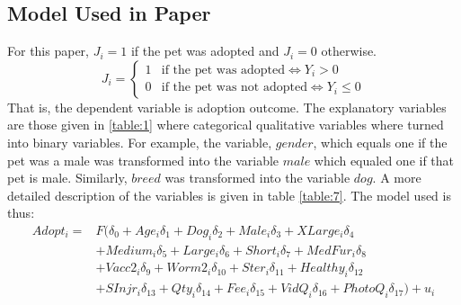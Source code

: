 \documentclass[12pt]{article}
\newcommand{\LRA}{\Leftrightarrow}
\begin{document}
		\subsection{Model Used in Paper}
		For this paper, $ J_i=1 $ if the pet was adopted and $ J_i=0 $ otherwise.
		\begin{equation}
			J_i=\begin{cases}
			1& \text{if the pet was adopted} \LRA Y_i>0 \\
			0& \text{if the pet was not adopted} \LRA Y_i \leq 0
			\end{cases}
		\end{equation}
		That is, the dependent variable is adoption outcome. The explanatory variables are those given in \ref{table:1} where categorical qualitative variables where turned into binary variables. For example, the variable, $ gender $, which equals one if the pet was a male was transformed into the variable $ male $ which equaled one if that pet is male. Similarly, $ breed $ was transformed into the variable $ dog $. A more detailed description of the variables is given in table \ref{table:7}. The model used is thus:
		\begin{align}
			Adopt_i=&F(\delta_0 + Age_i\delta_1+     Dog_i\delta_2+     Male_i\delta_3+     XLarge_i\delta_4 \nonumber \\
			&+Medium_i\delta_5+   Large_i\delta_6+    Short_i\delta_7+ MedFur_i\delta_8 \nonumber\\
			&+Vacc2_i\delta_9+    Worm2_i\delta_{10}  +Ster_i\delta_{11}+     Healthy_i\delta_{12} \nonumber \\  
			&+SInjr_i\delta_{13} +Qty_i\delta_{14}+      Fee_i\delta_{15}+      VidQ_i\delta_{16}+  PhotoQ_i\delta_{17}  ) + u_i 
		\end{align}
\end{document}
